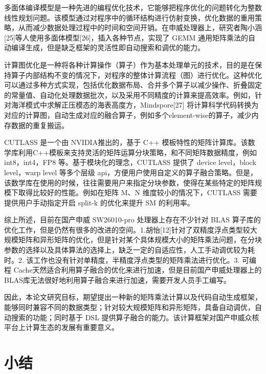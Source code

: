 多面体编译模型是一种先进的编程优化技术，它能够把程序优化的问题转化为整数线性规划问题。该模型通过对程序中的循环结构进行仿射变换，优化数据的重用策略，从而减少数据处理过程中的时间和空间开销。在申威处理器上，研究者陶小涵[25]等人使用多面体模型[26]，插入各种节点，实现了 GEMM 通用矩阵乘法的自动编译生成，但是缺乏框架的灵活性即自动搜索和调优的能力。

计算图优化是一种将各种计算操作（算子）作为基本处理单元的技术，目的是在保持算子内部结构不变的情况下，对程序的整体计算流程（图）进行优化。这种优化可以通过多种方式实现，包括优化数据布局、合并多个算子以减少操作、折叠固定的常量值、自动化处理数据批次，以及采用不同精度的计算来提高效率。例如，针对海洋模式中求解正压模态的海表高度方，Mindspore[27] 将计算科学代码转换为对应的计算图，自动生成对应的融合算子，例如多个element-wise的算子，减少内存数据的重复搬运。

CUTLASS 是一个由 NVIDIA推出的，基于 C++ 模板特性的矩阵计算库。该数学库利用C++模板来支持灵活的矩阵运算分块策略，和不同矩阵数据精度，例如 int8，int4，FP8 等。基于模块化的理念，CUTLASS 提供了 device level，block level，warp level 等多个层级 api，方便用户使用自定义的算子融合策略。但是，该数学库在使用的时候，往往需要用户来指定分块参数，使得在某些特定的矩阵规模下取得比较好的性能。例如在矩阵 M、N 维度较小的情况下，CUTLASS 需要提供用户手动指定开启 split-k 的优化来提升 SM 的利用率。

综上所述，目前在国产申威 SW26010-pro 处理器上存在不少针对 BLAS 算子库的优化工作，但是仍然有很多的改进的空间。1.胡怡[12]针对了双精度浮点类型较大规模矩阵和异形矩阵的优化，但是针对某个具体规模大小的矩阵乘法问题，在分块参数的选择以及具体算法的选择上，缺乏一定的自适应性，人工手动调优较为耗时。2. 该工作也没有针对单精度，半精度浮点类型的矩阵乘法进行优化。3. 可编程 Cache天然适合利用算子融合的优化来进行加速，但是目前国产申威处理器上的 BLAS库无法很好地利用算子融合来进行加速，需要开发人员手工编写。

因此，本论文研究目标，期望提出一种新的矩阵乘法计算以及代码自动生成框架，能够同时兼容不同的数据类型；针对较大规模矩阵和异形矩阵，具备自动调优，自动搜索的功能；同时基于 DSL 提供算子融合的能力。该计算框架对国产申威众核平台上计算生态的发展有重要意义。

\section{小结}


